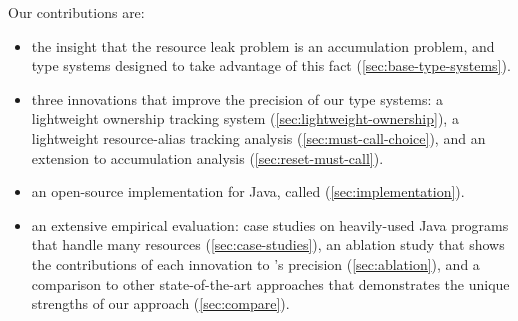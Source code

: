 Our contributions are:
\begin{itemize}
\item the insight that the resource leak problem is an accumulation
  problem, and
  type systems designed to take advantage
  of this fact (\cref{sec:base-type-systems}).
\item three
  innovations that improve the precision of our type
  systems: a lightweight ownership tracking system
  (\cref{sec:lightweight-ownership}), a lightweight resource-alias
  tracking analysis (\cref{sec:must-call-choice}), and an extension to
  accumulation analysis (\cref{sec:reset-must-call}).
\item an open-source implementation for Java,
  called \Tool (\cref{sec:implementation}).
\item an extensive empirical evaluation: case studies on heavily-used
  Java programs that handle many resources (\cref{sec:case-studies}),
  an ablation study that shows the contributions of each innovation to
  \Tool's precision (\cref{sec:ablation}), and a comparison to
  other state-of-the-art approaches that demonstrates the unique strengths
  of our approach (\cref{sec:compare}).
\end{itemize}
  

